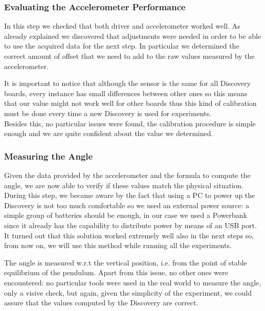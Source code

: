 \subsubsection{Evaluating the Accelerometer Performance}
In this step we checked that both driver and accelerometer worked well. As already explained we discovered that adjustments were needed in order to be able to use the acquired data for the next step. In particular we determined the correct amount of offset that we need to add to the raw values measured by the accelerometer. \par It is important to notice that although the sensor is the same for all Discovery boards, every instance has small differences between other ones so this means that our value might not work well for other boards thus this kind of calibration must be done every time a new Discovery is used for experiments. \\ Besides this, no particular issues were found, the calibration procedure is simple enough and we are quite confident about the value we determined.
\subsubsection{Measuring the Angle}
Given the data provided by the accelerometer and the formula to compute the angle, we are now able to verify if these values match the physical situation. During this step, we became aware by the fact that using a PC to power up the Discovery is not too much comfortable so we used an external power source: a simple group of batteries should be enough, in our case we used a Powerbank since it already has the capability to distribute power by means of an USB port. It turned out that this solution worked extremely well also in the next steps so, from now on, we will use this method while running all the experiments. \par The angle is measured w.r.t the vertical position, i.e. from the point of stable equilibrium of the pendulum. Apart from this issue, no other ones were encountered: no particular tools were used in the real world to measure the angle, only a visive check, but again, given the simplicity of the experiment, we could assure that the values computed by the Discovery are correct. 
